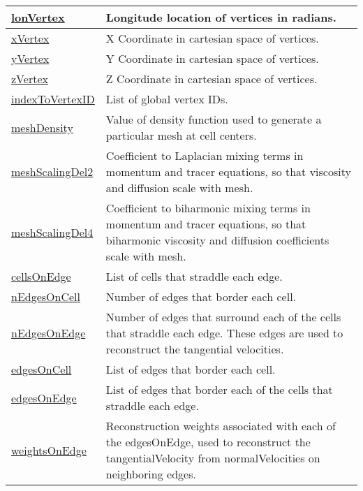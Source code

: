 {\begin{center}
\begin{longtable}{| p{2.0in} | p{4.0in} |}
    \hline
    \hyperref[subsec:var_sec_mesh_lonVertex]{lonVertex} & Longitude location of vertices in radians. \\
    \hline
    \hyperref[subsec:var_sec_mesh_xVertex]{xVertex} & X Coordinate in cartesian space of vertices. \\
    \hline
    \hyperref[subsec:var_sec_mesh_yVertex]{yVertex} & Y Coordinate in cartesian space of vertices. \\
    \hline
    \hyperref[subsec:var_sec_mesh_zVertex]{zVertex} & Z Coordinate in cartesian space of vertices. \\
    \hline
    \hyperref[subsec:var_sec_mesh_indexToVertexID]{indexToVertexID} & List of global vertex IDs. \\
    \hline
    \hyperref[subsec:var_sec_mesh_meshDensity]{meshDensity} & Value of density function used to generate a particular mesh at cell centers. \\
    \hline
    \hyperref[subsec:var_sec_mesh_meshScalingDel2]{meshScalingDel2} & Coefficient to Laplacian mixing terms in momentum and tracer equations, so that viscosity and diffusion scale with mesh. \\
    \hline
    \hyperref[subsec:var_sec_mesh_meshScalingDel4]{meshScalingDel4} & Coefficient to biharmonic mixing terms in momentum and tracer equations, so that biharmonic viscosity and diffusion coefficients scale with mesh. \\
    \hline
    \hyperref[subsec:var_sec_mesh_cellsOnEdge]{cellsOnEdge} & List of cells that straddle each edge. \\
    \hline
    \hyperref[subsec:var_sec_mesh_nEdgesOnCell]{nEdgesOnCell} & Number of edges that border each cell. \\
    \hline
    \hyperref[subsec:var_sec_mesh_nEdgesOnEdge]{nEdgesOnEdge} & Number of edges that surround each of the cells that straddle each edge. These edges are used to reconstruct the tangential velocities. \\
    \hline
    \hyperref[subsec:var_sec_mesh_edgesOnCell]{edgesOnCell} & List of edges that border each cell. \\
    \hline
    \hyperref[subsec:var_sec_mesh_edgesOnEdge]{edgesOnEdge} & List of edges that border each of the cells that straddle each edge. \\
    \hline
    \hyperref[subsec:var_sec_mesh_weightsOnEdge]{weightsOnEdge} & Reconstruction weights associated with each of the edgesOnEdge, used to reconstruct the tangentialVelocity from normalVelocities on neighboring edges. \\

\end{longtable}
\end{center}}
